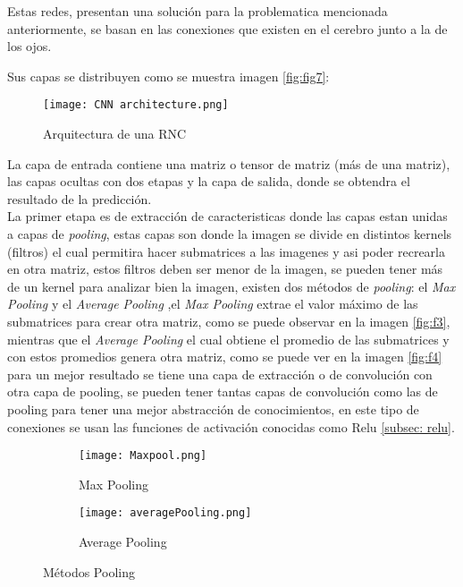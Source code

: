             Estas redes, presentan una soluci\'on para la problematica mencionada anteriormente, se basan en las conexiones que existen en 
            el cerebro junto a la de los ojos.

            Sus capas se distribuyen como se muestra imagen \eqref{fig:fig7}:
            
            
            \begin{figure}[H]
                \centering
                \texttt{[image: CNN architecture.png]}
                \caption{Arquitectura de una RNC \cite{Ortiz2020}}
                \label{fig:fig9}
            \end{figure}

            La capa de entrada contiene una matriz o tensor de matriz (m\'as de una matriz), las capas ocultas con dos etapas y la 
            capa de salida, donde se obtendra el resultado de la predicci\'on. \\
            La primer etapa es de extracci\'on de caracteristicas donde las capas estan unidas a capas de \textit{pooling}, estas capas son 
            donde la imagen se divide en distintos kernels (filtros) el cual permitira hacer submatrices a las imagenes y asi poder recrearla
            en otra matriz, estos filtros deben ser menor de la imagen, se pueden tener m\'as de un kernel para
            analizar bien la imagen, existen dos m\'etodos de \textit{pooling}: el \textit{Max Pooling} y el \textit{Average Pooling}
            ,el \textit{Max Pooling} extrae el valor m\'aximo de las submatrices para crear otra matriz, como se puede observar en la 
            imagen \eqref{fig:f3}, mientras que el \textit{Average Pooling} el cual obtiene el promedio de las submatrices y con 
            estos promedios genera otra matriz, como se puede ver en la imagen \eqref{fig:f4} para un mejor resultado se tiene una capa de extracci\'on 
            o de convoluci\'on con otra capa de pooling, se pueden tener tantas capas de convoluci\'on como las de pooling 
            para tener una mejor abstracci\'on de conocimientos, en este tipo de conexiones se usan las funciones de activaci\'on conocidas como Relu \eqref{subsec: relu}. 

            \begin{figure}[H]
                \begin{subfigure}[H]{0.49\textwidth}
                    \texttt{[image: Maxpool.png]}
                    \caption{Max Pooling}
                    \label{fig:f3}
                \end{subfigure}
                \hfill
                \begin{subfigure}[H]{0.49\textwidth}
                    \texttt{[image: averagePooling.png]}
                    \caption{Average Pooling}
                    \label{fig:f4}
                \end{subfigure}
                \caption{M\'etodos Pooling}
            \end{figure}


